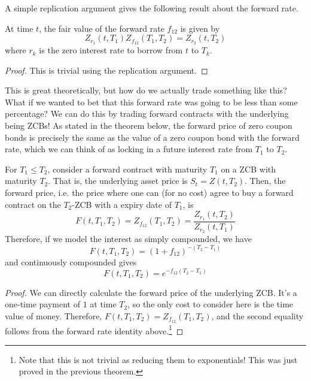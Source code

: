 \documentclass{article}
\begin{document}
    A simple replication argument gives the following result about the forward rate. 

    \begin{theorem}
      At time $t$, the fair value of the forward rate $f_{12}$ is given by 
      \begin{equation}
        Z_{r_1} (t, T_1) Z_{f_{12}} (T_1, T_2) = Z_{r_2} (t, T_2)
      \end{equation}
      where $r_k$ is the zero interest rate to borrow from $t$ to $T_k$. 
    \end{theorem}
    \begin{proof}
      This is trivial using the replication argument.
    \end{proof}

    This is great theoretically, but how do we actually trade something like this? What if we wanted to bet that this forward rate was going to be less than some percentage? We can do this by trading forward contracts with the underlying being ZCBs! As stated in the theorem below, the forward price of zero coupon bonds is precisely the same as the value of a zero coupon bond with the forward rate, which we can think of as locking in a future interest rate from $T_1$ to $T_2$.  

    \begin{theorem}
      For $T_1 \leq T_2$, consider a forward contract with maturity $T_1$ on a ZCB with maturity $T_2$. That is, the underlying asset price is $S_t = Z(t, T_2)$. Then, the forward price, i.e. the price where one can (for no cost) agree to buy a forward contract on the $T_2$-ZCB with a expiry date of $T_1$, is 
      \begin{equation}
        F(t, T_1, T_2) = Z_{f_{12}} (T_1, T_2) = \frac{Z_{r_1} (t, T_2)}{Z_{r_2} (t, T_1)}
      \end{equation}
      Therefore, if we model the interest as simply compounded, we have 
      \begin{equation}
        F(t, T_1, T_2) = (1 + f_{12})^{-(T_2 - T_1)}
      \end{equation}
      and continuously compounded gives 
      \begin{equation}
        F(t, T_1, T_2) = e^{ -f_{12} (T_2 - T_1)}
      \end{equation}
    \end{theorem}
    \begin{proof}
      We can directly calculate the forward price of the underlying ZCB. It's a one-time payment of $1$ at time $T_2$, so the only cost to consider here is the time value of money. Therefore, $F(t, T_1, T_2) = Z_{f_{12}} (T_1, T_2)$, and the second equality follows from the forward rate identity above.\footnote{Note that this is not trivial as reducing them to exponentials! This was just proved in the previous theorem. } 
    \end{proof}
\end{document}
